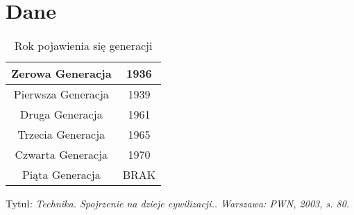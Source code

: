 \documentclass[a4paper,12pt,twoside]{book}
\begin{document}
\chapter{Dane}


\centering
\begin{table}[ht]
\caption{Rok pojawienia się generacji}
\centering
\begin{tabular}{|c|c|}
\hline
Zerowa Generacja & 1936 \\
\hline
Pierwsza Generacja & 1939  \\
\hline
Druga Generacja & 1961  \\
\hline
Trzecia Generacja & 1965  \\
\hline
Czwarta Generacja & 1970  \\
\hline
Piąta Generacja & BRAK  \\
\hline
\end{tabular}
\end{table}







\begin{thebibliography}{99}
 Tytuł:
\emph{Technika. Spojrzenie na dzieje cywilizacji.. Warszawa: PWN, 2003, s. 80.}
\end{thebibliography}



\listoffigures
{}

\listoftables
\end{document}
